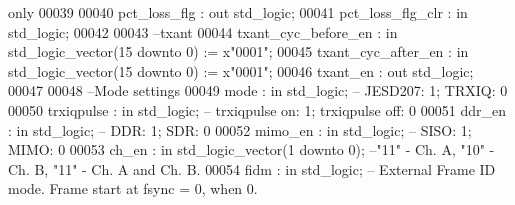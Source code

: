 \begin{DoxyCode}
{       only}
00039             
00040       \textcolor{vhdlchar}{pct_loss_flg}         \textcolor{vhdlchar}{:} \textcolor{keywordflow}{out} \textcolor{comment}{std\_logic};
00041       \textcolor{vhdlchar}{pct_loss_flg_clr}     \textcolor{vhdlchar}{:} \textcolor{keywordflow}{in} \textcolor{comment}{std\_logic};
00042       
00043 \textcolor{keyword}{      --txant}
00044       \textcolor{vhdlchar}{txant_cyc_before_en}  \textcolor{vhdlchar}{:} \textcolor{keywordflow}{in} \textcolor{comment}{std\_logic\_vector}\textcolor{vhdlchar}{(}\textcolor{vhdllogic}{}\textcolor{vhdllogic}{15} \textcolor{keywordflow}{downto} \textcolor{vhdllogic}{}\textcolor{vhdllogic}{0}\textcolor{vhdlchar}{)} \textcolor{vhdlchar}{:=} \textcolor{vhdlchar}{x}\textcolor{vhdllogic}{"0001"};
00045       \textcolor{vhdlchar}{txant_cyc_after_en}   \textcolor{vhdlchar}{:} \textcolor{keywordflow}{in} \textcolor{comment}{std\_logic\_vector}\textcolor{vhdlchar}{(}\textcolor{vhdllogic}{}\textcolor{vhdllogic}{15} \textcolor{keywordflow}{downto} \textcolor{vhdllogic}{}\textcolor{vhdllogic}{0}\textcolor{vhdlchar}{)} \textcolor{vhdlchar}{:=} \textcolor{vhdlchar}{x}\textcolor{vhdllogic}{"0001"};
00046       \textcolor{vhdlchar}{txant_en}             \textcolor{vhdlchar}{:} \textcolor{keywordflow}{out} \textcolor{comment}{std\_logic};
00047       
00048 \textcolor{keyword}{      --Mode settings}
00049       \textcolor{vhdlchar}{mode}                 \textcolor{vhdlchar}{:} \textcolor{keywordflow}{in} \textcolor{comment}{std\_logic};\textcolor{keyword}{ -- JESD207: 1; TRXIQ: 0}
00050       \textcolor{vhdlchar}{trxiqpulse}           \textcolor{vhdlchar}{:} \textcolor{keywordflow}{in} \textcolor{comment}{std\_logic};\textcolor{keyword}{ -- trxiqpulse on: 1; trxiqpulse off: 0}
00051       \textcolor{vhdlchar}{ddr_en}               \textcolor{vhdlchar}{:} \textcolor{keywordflow}{in} \textcolor{comment}{std\_logic};\textcolor{keyword}{ -- DDR: 1; SDR: 0}
00052       \textcolor{vhdlchar}{mimo_en}              \textcolor{vhdlchar}{:} \textcolor{keywordflow}{in} \textcolor{comment}{std\_logic};\textcolor{keyword}{ -- SISO: 1; MIMO: 0}
00053       \textcolor{vhdlchar}{ch_en}                \textcolor{vhdlchar}{:} \textcolor{keywordflow}{in} \textcolor{comment}{std\_logic\_vector}\textcolor{vhdlchar}{(}\textcolor{vhdllogic}{}\textcolor{vhdllogic}{1} \textcolor{keywordflow}{downto} \textcolor{vhdllogic}{}\textcolor{vhdllogic}{0}\textcolor{vhdlchar}{)};\textcolor{keyword}{ --"11" - Ch. A, "10" - Ch. B, "11" - Ch. A
       and Ch. B. }
00054       \textcolor{vhdlchar}{fidm}                 \textcolor{vhdlchar}{:} \textcolor{keywordflow}{in} \textcolor{comment}{std\_logic};\textcolor{keyword}{ -- External Frame ID mode. Frame start at fsync = 0, when 0.
}
\end{DoxyCode}

